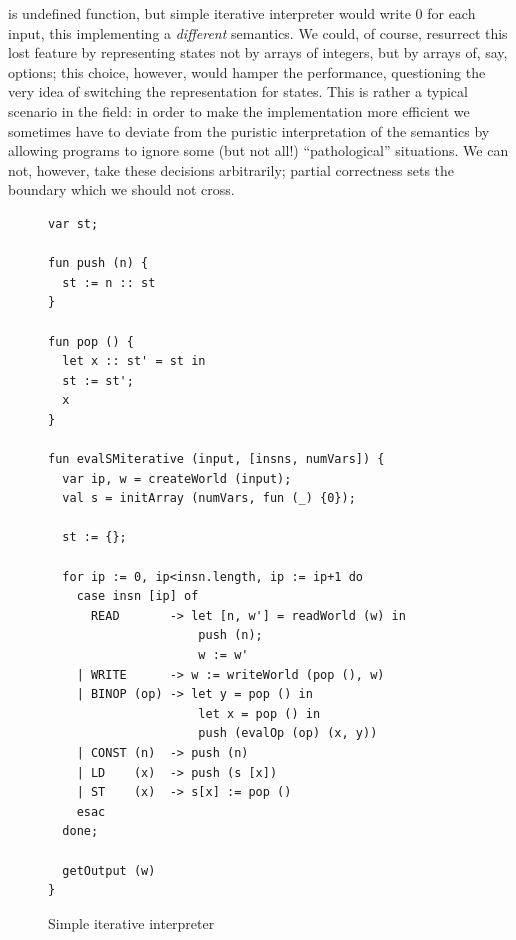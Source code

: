 is undefined function, but simple iterative interpreter would write 0 for each input, this implementing a \emph{different} semantics. We could, of course,
resurrect this lost feature by representing states not by arrays of integers, but by arrays of, say, options; this choice, however, would hamper the
performance, questioning the very idea of switching the representation for states. This is rather a typical scenario in the field: in order to
make the implementation more efficient we sometimes have to deviate from the puristic interpretation of the semantics by allowing programs to ignore
some (but not all!) ``pathological'' situations. We can not, however, take these decisions arbitrarily; partial correctness sets the boundary
which we should not cross.


\begin{figure}
  \begin{lstlisting}[mathescape=true]
var st;

fun push (n) {
  st := n :: st      
}

fun pop () {
  let x :: st' = st in
  st := st';
  x
}

fun evalSMiterative (input, [insns, numVars]) {
  var ip, w = createWorld (input);  
  val s = initArray (numVars, fun (_) {0});
  
  st := {};

  for ip := 0, ip<insn.length, ip := ip+1 do
    case insn [ip] of
      READ       -> let [n, w'] = readWorld (w) in                    
                     push (n);
                     w := w'
    | WRITE      -> w := writeWorld (pop (), w)
    | BINOP (op) -> let y = pop () in
                     let x = pop () in
                     push (evalOp (op) (x, y))
    | CONST (n)  -> push (n)
    | LD    (x)  -> push (s [x])
    | ST    (x)  -> s[x] := pop ()
    esac
  done;

  getOutput (w)
}
  \end{lstlisting}
  \caption{Simple iterative interpreter}
  \label{simple-iterative}
\end{figure}

